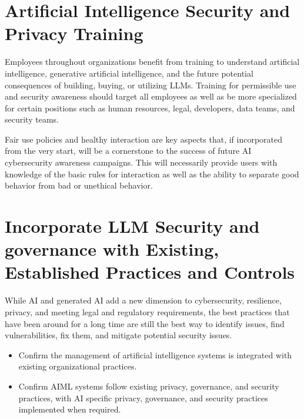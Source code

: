 \clearpage

\section{Artificial Intelligence Security and Privacy Training}
Employees throughout organizations benefit from training to understand
artificial intelligence, generative artificial intelligence, and the future
potential consequences of building, buying, or utilizing LLMs. Training for
permissible use and security awareness should target all employees as well as
be more specialized for certain positions such as human resources, legal,
developers, data teams, and security teams.

Fair use policies and healthy interaction are key aspects that, if incorporated
from the very start, will be a cornerstone to the success of future AI
cybersecurity awareness campaigns. This will necessarily provide users with
knowledge of the basic rules for interaction as well as the ability to separate
good behavior from bad or unethical behavior.

\section{Incorporate LLM Security and governance with Existing, Established Practices and Controls}
While AI and generated AI add a new dimension to cybersecurity, resilience,
privacy, and meeting legal and regulatory requirements, the best practices that
have been around for a long time are still the best way to identify issues,
find vulnerabilities, fix them, and mitigate potential security issues.

\begin{itemize}
  \item Confirm the management of artificial intelligence systems is integrated
  with existing organizational practices.
  \item Confirm AIML systems follow existing privacy, governance, and security
  practices, with AI specific privacy, governance, and security practices
  implemented when required.
\end{itemize}

